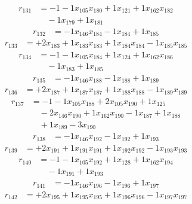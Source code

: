 \[\begin{aligned}
r_{131} &= - 1 - 1 x_{105} x_{180} + 1 x_{121} + 1 x_{162} x_{182} \\
 &\quad - 1 x_{179} + 1 x_{181}
\end{aligned}\]
\[\begin{aligned}
r_{132} &= - 1 x_{146} x_{184} - 1 x_{184} + 1 x_{185}
\end{aligned}\]
\[\begin{aligned}
r_{133} &= + 2 x_{183} + 1 x_{183} x_{183} + 1 x_{184} x_{184} - 1 x_{185} x_{185}
\end{aligned}\]
\[\begin{aligned}
r_{134} &= - 1 - 1 x_{105} x_{184} + 1 x_{124} + 1 x_{162} x_{186} \\
 &\quad - 1 x_{183} + 1 x_{185}
\end{aligned}\]
\[\begin{aligned}
r_{135} &= - 1 x_{146} x_{188} - 1 x_{188} + 1 x_{189}
\end{aligned}\]
\[\begin{aligned}
r_{136} &= + 2 x_{187} + 1 x_{187} x_{187} + 1 x_{188} x_{188} - 1 x_{189} x_{189}
\end{aligned}\]
\[\begin{aligned}
r_{137} &= - 1 - 1 x_{105} x_{188} + 2 x_{105} x_{190} + 1 x_{125} \\
 &\quad - 2 x_{146} x_{190} + 1 x_{162} x_{190} - 1 x_{187} + 1 x_{188} \\
 &\quad + 1 x_{189} - 3 x_{190}
\end{aligned}\]
\[\begin{aligned}
r_{138} &= - 1 x_{146} x_{192} - 1 x_{192} + 1 x_{193}
\end{aligned}\]
\[\begin{aligned}
r_{139} &= + 2 x_{191} + 1 x_{191} x_{191} + 1 x_{192} x_{192} - 1 x_{193} x_{193}
\end{aligned}\]
\[\begin{aligned}
r_{140} &= - 1 - 1 x_{105} x_{192} + 1 x_{128} + 1 x_{162} x_{194} \\
 &\quad - 1 x_{191} + 1 x_{193}
\end{aligned}\]
\[\begin{aligned}
r_{141} &= - 1 x_{146} x_{196} - 1 x_{196} + 1 x_{197}
\end{aligned}\]
\[\begin{aligned}
r_{142} &= + 2 x_{195} + 1 x_{195} x_{195} + 1 x_{196} x_{196} - 1 x_{197} x_{197}
\end{aligned}\]
